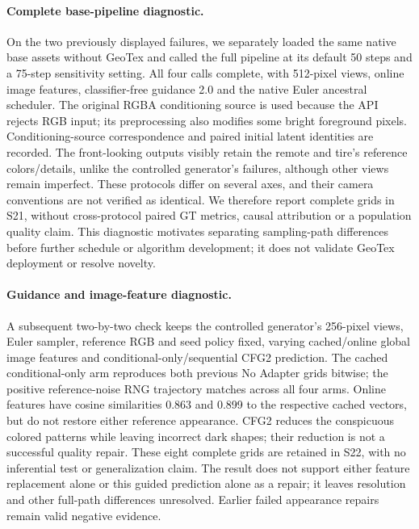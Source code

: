 \paragraph{Complete base-pipeline diagnostic.}
On the two previously displayed failures, we separately loaded the same native base assets without GeoTex and called the full pipeline at its default 50 steps and a 75-step sensitivity setting. All four calls complete, with 512-pixel views, online image features, classifier-free guidance 2.0 and the native Euler ancestral scheduler. The original RGBA conditioning source is used because the API rejects RGB input; its preprocessing also modifies some bright foreground pixels. Conditioning-source correspondence and paired initial latent identities are recorded. The front-looking outputs visibly retain the remote and tire's reference colors/details, unlike the controlled generator's failures, although other views remain imperfect. These protocols differ on several axes, and their camera conventions are not verified as identical. We therefore report complete grids in S21, without cross-protocol paired GT metrics, causal attribution or a population quality claim. This diagnostic motivates separating sampling-path differences before further schedule or algorithm development; it does not validate GeoTex deployment or resolve novelty.

\paragraph{Guidance and image-feature diagnostic.}
A subsequent two-by-two check keeps the controlled generator's 256-pixel views, Euler sampler, reference RGB and seed policy fixed, varying cached/online global image features and conditional-only/sequential CFG2 prediction. The cached conditional-only arm reproduces both previous No Adapter grids bitwise; the positive reference-noise RNG trajectory matches across all four arms. Online features have cosine similarities 0.863 and 0.899 to the respective cached vectors, but do not restore either reference appearance. CFG2 reduces the conspicuous colored patterns while leaving incorrect dark shapes; their reduction is not a successful quality repair. These eight complete grids are retained in S22, with no inferential test or generalization claim. The result does not support either feature replacement alone or this guided prediction alone as a repair; it leaves resolution and other full-path differences unresolved. Earlier failed appearance repairs remain valid negative evidence.

